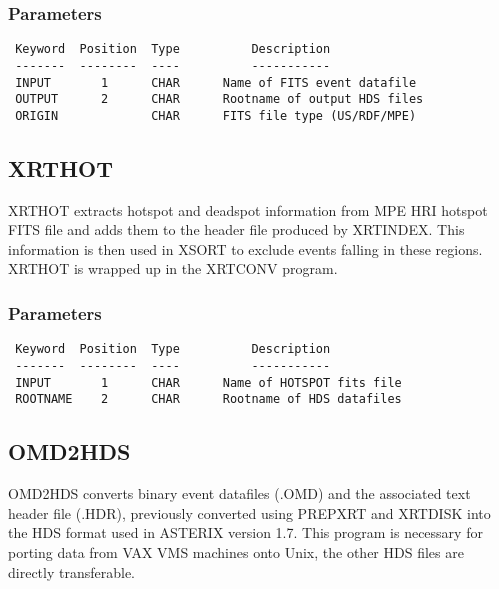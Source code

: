 \documentclass{book}
\renewcommand{\_}{{\tt\char'137}}     %
\begin{document}
\subsubsection{Parameters}
\begin{verbatim}
 Keyword  Position  Type          Description
 -------  --------  ----          -----------
 INPUT       1      CHAR      Name of FITS event datafile
 OUTPUT      2      CHAR      Rootname of output HDS files
 ORIGIN             CHAR      FITS file type (US/RDF/MPE)

\end{verbatim}\subsection{XRTHOT}
XRTHOT extracts hotspot and deadspot information from MPE HRI hotspot
FITS file and adds them to the header file produced by XRTINDEX. This
information is then used in XSORT to exclude events falling in these
regions. XRTHOT is wrapped up in the XRTCONV program.

\subsubsection{Parameters}
\begin{verbatim}
 Keyword  Position  Type          Description
 -------  --------  ----          -----------
 INPUT       1      CHAR      Name of HOTSPOT fits file
 ROOTNAME    2      CHAR      Rootname of HDS datafiles

\end{verbatim}\subsection{OMD2HDS}
OMD2HDS converts binary event datafiles (.OMD) and the associated text
header file (.HDR), previously converted using PREPXRT and XRTDISK into
the HDS format used in ASTERIX version 1.7. This program is necessary
for porting data from VAX VMS machines onto Unix, the other HDS files
are directly transferable.
\end{document}
